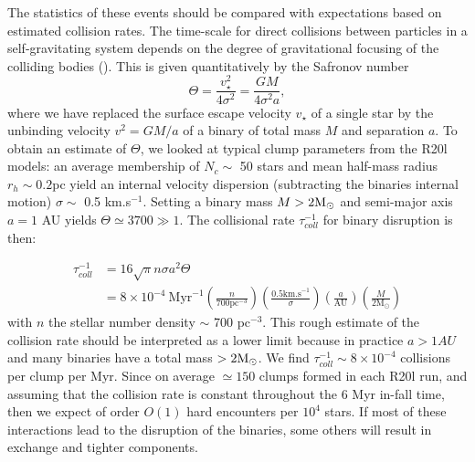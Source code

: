 The statistics of these events should be compared with expectations based on estimated collision rates. 
The  time-scale for direct collisions between  particles in a self-gravitating system  depends on the degree of gravitational focusing of the colliding bodies  (\citealt[section 7.5.8, Eq. 7.195a]{BT}). This is given quantitatively by the Safronov number
\begin{equation}
\Theta =  \frac{v_\star^2}{4\sigma^2} = \frac{G M }{ 4\sigma^2 a },
\end{equation}
 where we have replaced the surface escape velocity $v_\star$ of a single star by the 
unbinding velocity $v^2 = GM/a$ of a binary of total mass $M$ and separation $a$. To obtain an estimate of $\Theta$, we looked at typical clump parameters from the R20l models: an average membership of $N_c \sim$ 50 stars and mean half-mass radius $r_{h}\sim 0.2$pc yield  an internal velocity dispersion (subtracting the binaries internal motion) $\sigma \sim$ 0.5 km.s$^{-1}$. Setting a binary mass $ M > 2 {\textrm{M}_\odot}$ and semi-major axis $ a = 1 $ AU yields $\Theta \simeq 3 700 \gg 1$. The collisional rate $\tau_{coll}^{-1}$  for binary disruption is then: 

\begin{align}
\label{Eq:6_collrate}
\tau_{coll}^{-1} &= 16 \sqrt{\pi} n \sigma a^2 \Theta \nonumber\\
			&= 8\times 10^{-4}~ \textrm{Myr}^{-1} \left(\frac{n}{700 \textrm{pc}^{-3}}\right) \left(\frac{0.5 \textrm{km.s}^{-1}}{\sigma}\right) \left(\frac{a}{\textrm{AU}}\right) \left(\frac{M}{2 \textrm{M}_\odot}\right)
\end{align}
with $n$ the stellar number density  $\sim$ 700 pc$^{-3}$. 
This rough estimate of the collision rate should be interpreted as a lower limit because in practice $a > 1 AU$ and many binaries have a total mass $> 2 {\textrm{M}_\odot}$. We find  $\tau_{coll}^{-1} \sim 8\times 10^{-4}$ collisions per clump per Myr. Since on average $\simeq 150$ clumps formed in each R20l run, and assuming that the collision rate is 
constant throughout the 6 Myr  in-fall time, then we expect of order $O(1) $  hard  encounters  per $10^4$ stars. If most of these interactions lead to  the disruption of the binaries, some others  will result in exchange and tighter components. 

